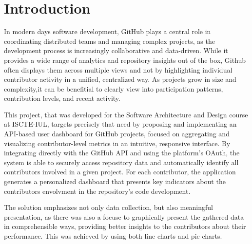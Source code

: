 \documentclass[12pt,reqno, twoside]{amsbook}
\theoremstyle{plain}
\numberwithin{equation}{chapter}
\numberwithin{section}{chapter}
\begin{document}


\frontmatter
{}

\tableofcontents

\listoffigures
\listoftables

\printglossary[type=\acronymtype,style=glostable,title={List of Acronyms}]

\mainmatter

%

\setcounter{page}{1} 

\chapter{Introduction}
\noindent In modern days software development, GitHub plays a central role in coordinating distributed teams and managing complex 
projects, as the development process is increasingly collaborative and data-driven. While it provides a wide range of 
analytics and repository insights out of the box, Github often displays them across multiple views and not by highlighting 
individual contributor activity in a unified, centralized way. As projects grow in size and complexity,it can be benefitial 
to clearly view into participation patterns, contribution levels, and recent activity.

This project, that was developed for the Software Architecture and Design course at ISCTE-IUL, targets precisely that need by 
proposing and implementing an API-based user dashboard for GitHub projects, focused on aggregating and visualizing contributor-level 
metrics in an intuitive, responsive interface. By integrating directly with the GitHub API and using the platform's OAuth, the 
system is able to securely access repository data and automatically identify all contributors involved in a given project. For each 
contributor, the application generates a personalized dashboard that presents key indicators about the contributors envolvment in 
the repository's code development.

The solution emphasizes not only data collection, but also meaningful presentation, as there was also a focuse to graphically 
present the gathered data in comprehensible ways, providing better insights to the contributors about their performance. This was 
achieved by using both line charts and pie charts.
\end{document}
